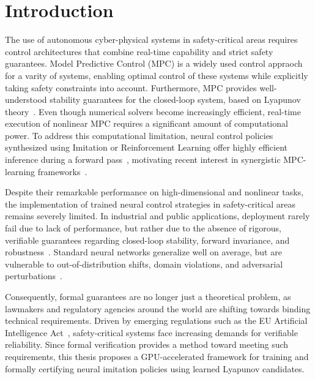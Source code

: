 \chapter{Introduction}
\label{ch:intro}

The use of autonomous cyber-physical systems in safety-critical areas requires control architectures that combine
real-time capability and strict safety guarantees. Model Predictive Control (MPC) is a widely used control appraoch 
for a varity of systems, enabling optimal control of these systems while explicitly taking safety constraints into account.
Furthermore, MPC provides well-understood stability guarantees for the closed-loop system, based on Lyapunov 
theory~\cite{gruneNonlinearModelPredictive2017,rawlingsModelPredictiveControl2020}. 
Even though numerical solvers become increasingly efficient, real-time execution of nonlinear 
MPC requires a significant amount of computational power.
To address this computational limitation, neural control policies synthesized using Imitation or Reinforcement Learning offer highly efficient inference 
during a forward pass~\cite{kargEfficientRepresentationApproximation2020,hertneckLearningApproximateModel2018,hewingLearningBasedModelPredictive2020}, 
motivating recent interest in synergistic MPC-learning frameworks~\cite{reiterSynthesisOfMPC2026}.

Despite their remarkable performance on high-dimensional and nonlinear tasks, the implementation of trained neural
control strategies in safety-critical areas remains severely limited. In industrial and public applications, deployment rarely fail
due to lack of performance, but rather due to the absence of rigorous, verifiable guarantees regarding closed-loop stability,
forward invariance, and robustness~\cite{yangLyapunovstableNeuralControl2024}. 
Standard neural networks generalize well on average, but are vulnerable to out-of-distribution shifts, 
domain violations, and adversarial 
perturbations~\cite{aggarwalNeuralNetworksDeep2023,zhangEfficientNeuralNetwork2018,goodfellowExplainingHarnessingAdversarial2015,szegedyIntriguingPropertiesNeural2014}. 

Consequently, formal guarantees are no longer just a theoretical problem, as lawmakers and regulatory agencies
around the world are shifting towards binding technical requirements. 
Driven by emerging regulations such as the EU Artificial Intelligence Act~\cite{VerordnungEU20242024}, 
safety-critical systems face increasing demands for verifiable reliability.
Since formal verification provides a method toward meeting such requirements, this thesis proposes a 
GPU-accelerated framework for training and formally certifying neural imitation policies using learned Lyapunov candidates.


